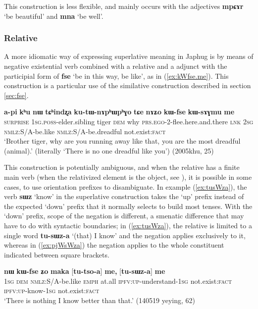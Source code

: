 \documentclass[oneside,a4paper,11pt]{article}
\newcommand{\ipa}[1]{{\phon\textbf{#1}}} %
\newcommand{\forme}[2]{\ipa{#1} `#2'}
\begin{document}
This construction is less flexible, and mainly occurs with the adjectives \forme{mpɕɤr}{be beautiful} and \forme{mna}{be well}.

 \subsubsection{Relative} \label{sec:relative.superlative}
 A more idiomatic way of expressing superlative meaning in Japhug is by means of negative existential verb combined with a relative and a adjunct with the participial form of \forme{fse}{be in this way, be like}, as in (\ref{ex:kWfse.me}). This construction is a particular use of the similative construction described in section \ref{sec:fse}.
 
 \begin{exe}
\ex \label{ex:kWfse.me}
\gll \ipa{ama} 	\ipa{a-pi} 	\ipa{kʰu} 	\ipa{nɯ} 	\ipa{tɕʰindʐa} 	\ipa{ku-tɯ-nɤpʰɯpʰɣo} 	\ipa{tɕe}  \ipa{nɤʑo} 	\ipa{kɯ-fse} 	\ipa{kɯ-sɤɣmu} 	\ipa{me} 	\\
\textsc{surprise} \textsc{1sg.poss}-elder.sibling tiger \textsc{dem} why \textsc{prs.ego}-2-flee.here.and.there \textsc{lnk} \textsc{2sg}  \textsc{nmlz}:S/A-be.like   \textsc{nmlz}:S/A-be.dreadful  not.exist:\textsc{fact} \\
\glt `Brother tiger, why are you running away like that, you are the most dreadful (animal).' (literally `There is no one dreadful like you') (2005khu, 25)
\end{exe}

This construction is potentially ambiguous, and when the relative has a finite main verb (when the relativized element is the object, see \citealt{jacques16relatives}), it is possible in some cases, to use orientation prefixes to disambiguate. In example (\ref{ex:tusWza}), the verb \forme{sɯz}{know} in the superlative construction takes the `up' prefix instead of the expected `down' prefix that it normally selects to build most tenses. With the  `down' prefix, scope of the negation is different, a smenatic difference that may have to do with syntactic boundaries; in (\ref{ex:tusWza}), the relative is limited to a single word \ipa{tu-sɯz-a} `(that) I know' and the negation applies exclusively to it, whereas in (\ref{ex:pjWsWza}) the negation applies to the whole constituent indicated between square brackets.
 

\begin{exe}
\ex \label{ex:tusWza}
\gll \ipa{aʑo} 	\ipa{nɯ} 	\ipa{kɯ-fse} 	\ipa{ʑo} 	\ipa{maka} [\ipa{tu-tso-a}] 	\ipa{me,} [\ipa{tu-sɯz-a}] 	\ipa{me} \\
\textsc{1sg} \textsc{dem} \textsc{nmlz}:S/A-be.like \textsc{emph} at.all \textsc{ipfv:up}-understand-\textsc{1sg} not.exist:\textsc{fact} \textsc{ipfv:up}-know-\textsc{1sg} not.exist:\textsc{fact} \\
\glt `There is nothing I know better than that.' (140519 yeying, 62)
\end{exe}
\end{document}
